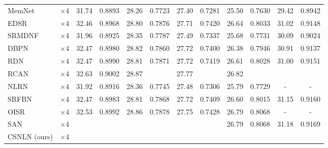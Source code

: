 \documentclass[10pt,twocolumn,letterpaper]{article}
\begin{document}
\begin{table*}[thbp]
\begin{center}
\begin{tabular}{|l|c|c|c|c|c|c|c|c|c|c|c|}
\\
MemNet~\cite{tai2017memnet} & $\times$4 
& 31.74
 & 0.8893
  & 28.26
   & 0.7723
    & 27.40
     & 0.7281
      & 25.50
       & 0.7630
        & 29.42
         & 0.8942
                   
\\
EDSR~\cite{lim2017enhanced} & $\times$4 
& 32.46
 & 0.8968
  & 28.80
   & 0.7876
    & 27.71
     & 0.7420
      & 26.64
       & 0.8033
        & 31.02
         & 0.9148
                   
\\
SRMDNF~\cite{zhang2018learning} & $\times$4 
& 31.96
 & 0.8925
  & 28.35
   & 0.7787
    & 27.49
     & 0.7337
      & 25.68
       & 0.7731
        & 30.09
         & 0.9024
                   
\\
DBPN~\cite{haris2018deep} & $\times$4 
& 32.47
 & 0.8980
  & 28.82
   & 0.7860
    & 27.72
     & 0.7400
      & 26.38
       & 0.7946
        & 30.91
         & 0.9137
         
\\
RDN~\cite{zhang2018residual} & $\times$4 
& 32.47
 & 0.8990
  & 28.81
   & 0.7871
    & 27.72
     & 0.7419
      & 26.61
       & 0.8028
        & 31.00
         & 0.9151
         
\\
RCAN~\cite{zhang2018image}& $\times$4 
& {32.63}
 & {0.9002}
  & {28.87}
   &\color{red}{0.7889}
    & {27.77}
     & \color{blue}{0.7436}
      &\color{blue} {26.82}
       & \color{blue}{0.8087}
        &\color{blue}{31.22}
         & \color{blue}{0.9173}
         
                   
\\
NLRN~\cite{liu2018non}& $\times$4 
& {31.92}
 & {0.8916}
  & {28.36}
   & {0.7745}
    & {27.48}
     & {0.7306}
      & {25.79}
       & {0.7729}
        & {-}
         & {-}
\\
SRFBN~\cite{li2019feedback} & $\times$4 
& {32.47}
 & {0.8983}
  & {28.81}
   & {0.7868}
    & {27.72}
     & {0.7409}
      & {26.60}
       & {0.8015}
        & {31.15}
         & {0.9160}
\\
OISR~\cite{he2019ode} & $\times$4 
&{32.53}
 &{0.8992}
  &{28.86}
   & {0.7878}
    &{27.75}
     & {0.7428}
      & {26.79}
       & {0.8068}
        & {-}
         & {-}
\\
SAN~\cite{dai2019second} & $\times$4 
& \color{blue}{32.64}
 &\color{blue}{0.9003}
  &\color{blue}{28.92}
   &\color{blue}{0.7888}
    &\color{blue}{27.78}
     & \color{blue}{0.7436}
      & {26.79}
       & {0.8068}
        & {31.18}
         & {0.9169}
\\
CSNLN (ours)  & $\times$4 
& \color{red}{32.68}
 & \color{red}{0.9004}
  & \color{red}{28.95}
   & \color{blue}{0.7888}
    & \color{red}{27.80}
     & \color{red}{0.7439}
      & \color{red}{27.22}
       & \color{red}{0.8168}
        & \color{red}{31.43}
         & \color{red}{0.9201}
         


\end{tabular}
\end{center}
\end{table*}
\end{document}
